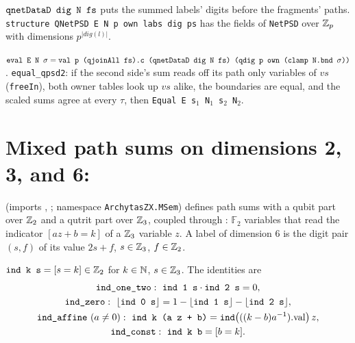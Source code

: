 \begin{definition}
$\textnormal{\texttt{qnetDataD dig N fs}}$ puts the summed labels' digits before the fragments' paths.
\textnormal{\texttt{structure QNetPSD E N p own labs dig ps}} has the fields of \textnormal{\texttt{NetPSD}} over $\mathbb{Z}_{p}$ with
dimensions $p^{|\mathit{dig}(l)|}$.
\end{definition}
\begin{theorem}
$\textnormal{\texttt{eval E N \ensuremath{\sigma}}} = \textnormal{\texttt{val p (\allowbreak{}qjoinAll fs).\allowbreak{}c (\allowbreak{}qnetDataD dig N fs) (\allowbreak{}qdig p own (\allowbreak{}clamp N.\allowbreak{}bnd \ensuremath{\sigma}))}}$.
\textnormal{\texttt{equal\_\allowbreak{}qpsd2}}: if the second side's sum reads off its path only variables of $vs$
(\textnormal{\texttt{freeIn}}), both owner tables look up $vs$ alike, the boundaries are equal, and the scaled
sums agree at every $\tau$, then \textnormal{\texttt{Equal E s\ensuremath{_1} N\ensuremath{_1} s\ensuremath{_2} N\ensuremath{_2}}}.
\end{theorem}

\section{Mixed path sums on dimensions 2, 3, and 6: \texorpdfstring{}{PathSumMixed}}\label{sec:lean-pathsum-mixed}

 (imports , ; namespace
\textnormal{\texttt{ArchytasZX.MSem}}) defines path sums with a qubit part over $\mathbb{Z}_{2}$ and a qutrit part over
$\mathbb{Z}_{3}$, coupled through : $\mathbb F_2$ variables that read the indicator
$[a z+b=k]$ of a $\mathbb{Z}_{3}$ variable $z$. A label of dimension $6$ is the digit pair $(s,f)$ of its
value $2s+f$, $s\in\mathbb{Z}_{3}$, $f\in\mathbb{Z}_{2}$.

\begin{definition}[Indicators]\label{def:lean-pathsum-ind}
$\textnormal{\texttt{ind k s}} = [s = k]\in\mathbb{Z}_{2}$ for $k\in\mathbb{N}$, $s\in\mathbb{Z}_{3}$. The identities are
\begin{gather*}
\textnormal{\texttt{ind\_one\_two}}:\ \textnormal{\texttt{ind 1 s}}\cdot\textnormal{\texttt{ind 2 s}}=0,\\
\textnormal{\texttt{ind\_zero}}:\ \lfloor\textnormal{\texttt{ind 0 s}}\rfloor = 1-\lfloor\textnormal{\texttt{ind 1 s}}\rfloor-\lfloor\textnormal{\texttt{ind 2 s}}\rfloor,\\
\textnormal{\texttt{ind\_affine}}\ (a\ne0):\ \textnormal{\texttt{ind k (a z + b)}} = \textnormal{\texttt{ind}}\bigl(((k-b)a^{-1}).\mathrm{val}\bigr)\,z,\\
\textnormal{\texttt{ind\_const}}:\ \textnormal{\texttt{ind k b}} = [b=k].
\end{gather*}
\end{definition}

